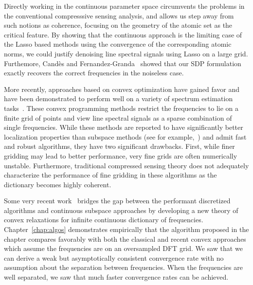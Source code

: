 Directly working in the continuous parameter space circumvents the problems in
the conventional compresssive sensing analysis, and allows us step away from
such notions as coherence, focusing on the geometry of the atomic set as the
critical feature. By showing that the continuous approach is the limiting case
of the Lasso based methods using the convergence of the corresponding atomic
norms, we could justify denoising line spectral signals using Lasso on a large
grid. Furthemore, Cand\`es and Fernandez-Granda~\cite{CandesGranda} showed that
our SDP formulation exactly recovers the correct frequencies in the noiseless
case.


More recently, approaches based on convex optimization have gained favor and
have been demonstrated to perform well on a variety of spectrum estimation
tasks~\cite{malioutov05,bourguignon2007irregular,baraniuk2010model,zweig2003irregular}. These convex programming methods restrict the frequencies to lie on a
finite grid of points and view line spectral signals as a sparse combination of
single frequencies. While these methods are reported to have significantly
better localization properties than subspace methods (see for
example,~\cite{malioutov05}) and admit fast and robust algorithms, they have
two significant drawbacks. First, while finer gridding may lead to better
performance, very fine grids are often numerically unstable. Furthermore,
traditional compressed sensing theory does not adequately characterize the
performance of fine gridding in these algorithms as the dictionary becomes
highly coherent.

Some very recent work~\cite{btr12,cg_exact12,cg_noisy} bridges the gap between
the performant discretized algorithms and continuous subspace approaches by
developing a new theory of convex relaxations for infinite continuous
dictionary of frequencies. Chapter~\ref{chap:algos} demonstrates empirically that the algorithm proposed in the chapter compares favorably with
both the classical and recent convex approaches which assume the frequencies
are on an oversampled DFT grid. We saw that we can derive a weak but asymptotically consistent convergence rate with no assumption about the
separation between frequencies. When the frequencies are well separated, we saw that much faster convergence rates can be achieved.

